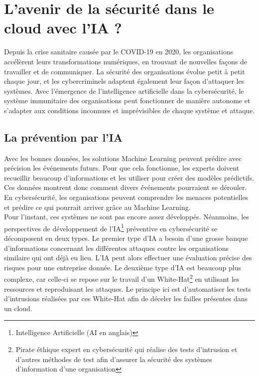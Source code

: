 \documentclass[a4paper, 12pt]{article}
\begin{document}
  \section{L'avenir de la sécurité dans le cloud avec l'IA ?}
    Depuis la crise sanitaire causée par le COVID-19 en 2020, les organisations
    accélèrent leurs transformations numériques, en trouvant de nouvelles façons
    de travailler et de communiquer. La sécurité des organisations évolue petit
    à petit chaque jour, et les cybercriminels adaptent également leur façon
    d'attaquer les systèmes. Avec l’émergence de l'intelligence artificielle
    dans la cybersécurité, le système immunitaire des organisations peut
    fonctionner de manière autonome et s'adapter aux conditions inconnues et
    imprévisibles de chaque système et attaque.

    \subsection{La prévention par l'IA}
      Avec les bonnes données, les solutions Machine Learning peuvent
      prédire avec précision les événements futurs. Pour que cela fonctionne,
      les experts doivent recueillir beaucoup d'informations et les utiliser
      pour créer des modèles prédictifs. Ces données montrent donc comment
      divers événements pourraient se dérouler. En cybersécurité, les
      organisations peuvent comprendre les menaces potentielles et prédire ce
      qui pourrait arriver grâce au Machine Learning. \\

      Pour l’instant, ces systèmes ne sont pas encore assez développés.
      Néanmoins, les perspectives de développement de l’IA\footnote{Intelligence
      Artificielle (AI en anglais)} préventive en cybersécurité se décomposent
      en deux types. Le premier type d'IA a besoin d’une grosse banque
      d'informations concernant les différentes attaques contre les
      organisations similaire qui ont déjà eu lieu. L'IA peut alors effectuer
      une évaluation précise des risques pour une entreprise donnée. Le deuxième
      type d’IA est beaucoup plus complexe, car celle-ci se repose sur le
      travail d’un White-Hat\footnote{Pirate éthique expert en cybersécurité qui
      réalise des tests d'intrusion et d'autres méthodes de test afin d'assurer
      la sécurité des systèmes d'information d'une organisation} en utilisant
      les ressources et reproduisant les attaques. Le principe ici est
      d’automatiser les tests d’intrusions réalisées par ces White-Hat afin de
      déceler les failles présentes dans un cloud.
\end{document}
